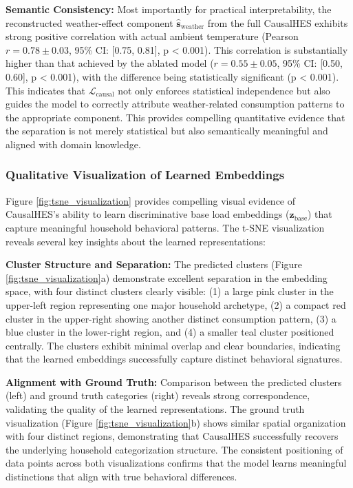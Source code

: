 \documentclass[journal]{IEEEtran}
\begin{document}
\textbf{Semantic Consistency:} Most importantly for practical interpretability, the reconstructed weather-effect component $\hat{\mathbf{s}}_{\text{weather}}$ from the full CausalHES exhibits strong positive correlation with actual ambient temperature (Pearson $r=0.78 \pm 0.03$, 95\% CI: [0.75, 0.81], p < 0.001). This correlation is substantially higher than that achieved by the ablated model ($r=0.55 \pm 0.05$, 95\% CI: [0.50, 0.60], p < 0.001), with the difference being statistically significant (p < 0.001). This indicates that $\mathcal{L}_{\text{causal}}$ not only enforces statistical independence but also guides the model to correctly attribute weather-related consumption patterns to the appropriate component. This provides compelling quantitative evidence that the separation is not merely statistical but also semantically meaningful and aligned with domain knowledge.

\subsubsection{Qualitative Visualization of Learned Embeddings}
Figure \ref{fig:tsne_visualization} provides compelling visual evidence of CausalHES's ability to learn discriminative base load embeddings ($\mathbf{z}_{\text{base}}$) that capture meaningful household behavioral patterns. The t-SNE visualization reveals several key insights about the learned representations:

\textbf{Cluster Structure and Separation:} The predicted clusters (Figure \ref{fig:tsne_visualization}a) demonstrate excellent separation in the embedding space, with four distinct clusters clearly visible: (1) a large pink cluster in the upper-left region representing one major household archetype, (2) a compact red cluster in the upper-right showing another distinct consumption pattern, (3) a blue cluster in the lower-right region, and (4) a smaller teal cluster positioned centrally. The clusters exhibit minimal overlap and clear boundaries, indicating that the learned embeddings successfully capture distinct behavioral signatures.

\textbf{Alignment with Ground Truth:} Comparison between the predicted clusters (left) and ground truth categories (right) reveals strong correspondence, validating the quality of the learned representations. The ground truth visualization (Figure \ref{fig:tsne_visualization}b) shows similar spatial organization with four distinct regions, demonstrating that CausalHES successfully recovers the underlying household categorization structure. The consistent positioning of data points across both visualizations confirms that the model learns meaningful distinctions that align with true behavioral differences.
\end{document}

